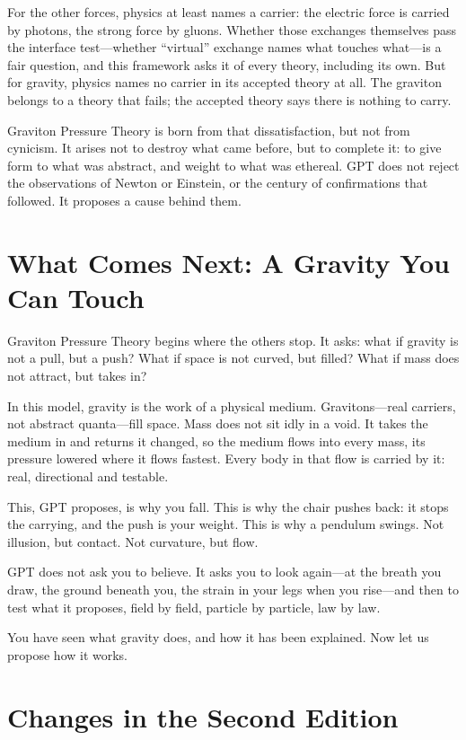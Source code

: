 \documentclass[11pt,a4paper]{article}
\begin{document}
For the other forces, physics at least names a carrier: the electric force is carried by photons, the strong force by gluons. Whether those exchanges themselves pass the interface test---whether ``virtual'' exchange names what touches what---is a fair question, and this framework asks it of every theory, including its own. But for gravity, physics names no carrier in its accepted theory at all. The graviton belongs to a theory that fails; the accepted theory says there is nothing to carry.

Graviton Pressure Theory is born from that dissatisfaction, but not from cynicism. It arises not to destroy what came before, but to complete it: to give form to what was abstract, and weight to what was ethereal. GPT does not reject the observations of Newton or Einstein, or the century of confirmations that followed. It proposes a cause behind them.

\section{What Comes Next: A Gravity You Can Touch}

Graviton Pressure Theory begins where the others stop. It asks: what if gravity is not a pull, but a push? What if space is not curved, but filled? What if mass does not attract, but takes in?

\begin{hypbar}
In this model, gravity is the work of a physical medium. Gravitons---real carriers, not abstract quanta---fill space. Mass does not sit idly in a void. It takes the medium in and returns it changed, so the medium flows into every mass, its pressure lowered where it flows fastest. Every body in that flow is carried by it: real, directional and testable.

This, GPT proposes, is why you fall. This is why the chair pushes back: it stops the carrying, and the push is your weight. This is why a pendulum swings. Not illusion, but contact. Not curvature, but flow.
\end{hypbar}

GPT does not ask you to believe. It asks you to look again---at the breath you draw, the ground beneath you, the strain in your legs when you rise---and then to test what it proposes, field by field, particle by particle, law by law.

You have seen what gravity does, and how it has been explained. Now let us propose how it works.

\clearpage
\section*{Changes in the Second Edition}
\end{document}
